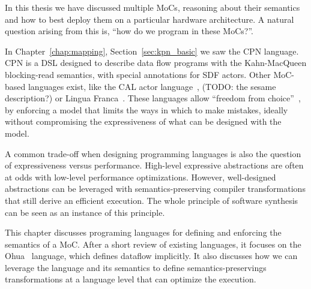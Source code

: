 In this thesis we have discussed multiple \acfp{MoC}, reasoning about their semantics and how to best deploy them on a particular hardware architecture.
A natural question arising from this is, ``how do we program in these \acp{MoC}?''.

In Chapter~\ref{chap:mapping}, Section~\ref{sec:kpn_basic} we saw the \acf{CPN} language.
\ac{CPN} is a \ac{DSL} designed to describe data flow programs with the Kahn-MacQueen blocking-read semantics, with special annotations for \ac{SDF} actors.
Other \ac{MoC}-based languages exist, like the CAL actor language~\cite{eker2003cal}, (TODO: the sesame description?) or Lingua Franca~\cite{lohstroh2020language}.
These languages allow ``freedom from choice''~\cite{lee2019freedom}, by enforcing a model that limits the ways in which to make mistakes, ideally without compromising the expressiveness of what can be designed with the model.

A common trade-off when designing programming languages is also the question of expressiveness versus performance.
High-level expressive abstractions are often at odds with low-level performance optimizations.
However, well-designed abstractions can be leveraged with semantics-preserving compiler transformations that still derive an efficient execution.
The whole principle of software synthesis can be seen as an instance of this principle.

This chapter discusses programing languages for defining and enforcing the semantics of a \ac{MoC}.
After a short review of existing languages, it focuses on the Ohua~\cite{ertel_phdthesis} language, which defines dataflow implicitly.
It also discusses how we can leverage the language and its semantics to define semantics-preservings transformations at a language level that can optimize the execution.
